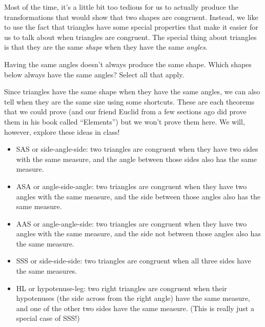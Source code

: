 \documentclass{ximera}
\begin{document}
Most of the time, it's a little bit too tedious for us to actually produce the transformations that would show that two shapes are congruent. Instead, we like to use the fact that triangles have some special properties that make it easier for us to talk about when triangles are congruent. The special thing about triangles is that they are the same \emph{shape} when they have the same \emph{angles}.
\begin{question}
Having the same angles doesn't always produce the same shape. Which shapes below always have the same angles? Select all that apply.
\begin{selectAll}
\end{selectAll}
\end{question}
Since triangles have the same shape when they have the same angles, we can also tell when they are the same size using some shortcuts. These are each theorems that we could prove (and our friend Euclid from a few sections ago did prove them in his book called ``Elements'') but we won't prove them here. We will, however, explore these ideas in class!
\begin{itemize}
	\item SAS or side-angle-side: two triangles are congruent when they have two sides with the same measure, and the angle between those sides also has the same measure.
	\item ASA or angle-side-angle: two triangles are congruent when they have two angles with the same measure, and the side between those angles also has the same measure.
	\item AAS or angle-angle-side: two triangles are congruent when they have two angles with the same measure, and the side not between those angles also has the same measure.
	\item SSS or side-side-side: two triangles are congruent when all three sides have the same measures.
	\item HL or hypotenuse-leg: two right triangles are congruent when their hypotenuses (the side across from the right angle) have the same measure, and one of the other two sides have the same measure. (This is really just a special case of SSS!)
\end{itemize}
\end{document}
